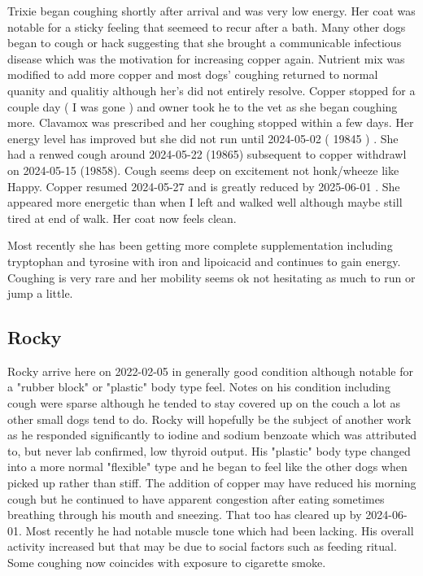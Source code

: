 \mjmtrixiecu

Trixie began coughing shortly after arrival and was
very low energy. Her coat was notable for a sticky
feeling that seemeed to recur after a bath.  
Many other dogs began to cough or
hack suggesting that she brought a communicable infectious
disease which was the motivation for increasing copper again. 
Nutrient mix was modified to add more copper and
most dogs' coughing returned to normal quanity and qualitiy
although her's did not entirely resolve. Copper stopped for a couple
day ( I was gone ) and owner took he to the vet as she
began coughing more. Clavamox was prescribed and her coughing
stopped within a few days. Her energy level has improved
but she did not  run until 2024-05-02 ( 19845 ) .  
She had a renwed cough around 2024-05-22 (19865)  subsequent to
copper withdrawl on 2024-05-15 (19858). 
Cough seems deep on excitement not honk/wheeze like Happy.
Copper resumed 2024-05-27 and is greatly reduced
by 2025-06-01 . 
She appeared more energetic than when I left and walked well
although maybe still tired at end of walk. 
Her coat now feels clean. 

Most recently she has been getting more complete supplementation
including tryptophan and tyrosine with iron and lipoicacid
and continues to gain energy. Coughing is very rare and her mobility
seems ok not hesitating as much to run or jump a little.  

\subsection{Rocky}

\mjmrockycu

\mjmrockyi

Rocky arrive here on 2022-02-05 in generally good condition
although notable for a "rubber block" or "plastic" body type feel.
Notes on his condition including cough were sparse although
he tended to stay covered up on the couch a lot as other small
dogs tend to do. 
Rocky will hopefully be the subject of another work as
he responded significantly to iodine and sodium benzoate
which was attributed to, but never lab confirmed, low
thyroid output. His "plastic" body type changed into
a more normal "flexible" type and he began to feel like 
the other dogs when picked up rather than stiff.
The addition of copper may have reduced his morning cough
but he continued to have apparent congestion after eating
sometimes breathing through his mouth and sneezing.
That too has cleared up by 2024-06-01.
Most recently he had notable muscle tone which had been lacking.
His overall activity increased but that may be due to social factors
such as feeding ritual. 
Some coughing now coincides with exposure to cigarette smoke.


